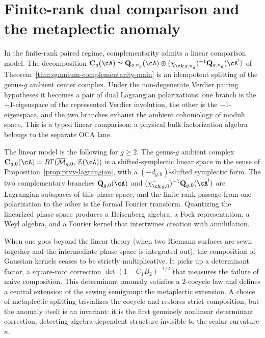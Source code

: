 \section{Finite-rank dual comparison and the metaplectic anomaly}
\label{sec:holographic-complementarity-metaplectic}

In the finite-rank paired regime, complementarity admits a
linear comparison model. The decomposition
$\mathbf{C}_g(\cA)\simeq\mathbf{Q}_{g,n_g}(\cA)\oplus
(\chi^-_{\cA;g,n_g})^{-1}\mathbf{Q}_{g,n_g}(\cA^!)$ of
Theorem~\ref{thm:quantum-complementarity-main}
is an idempotent splitting of the genus-$g$ ambient center complex.
Under the non-degenerate Verdier pairing hypotheses it becomes a
pair of dual Lagrangian polarizations: one branch is the
$+1$-eigenspace of the represented Verdier involution, the other is
the $-1$-eigenspace, and the two branches exhaust the ambient
cohomology of moduli space. This is a typed linear comparison; a
physical bulk factorization algebra belongs to the separate OCA lane.

The linear model is the following for $g\geq2$. The genus-$g$ ambient complex
$\mathbf{C}_{g,0}(\cA) = R\Gamma(\overline{\mathcal{M}}_{g,0},
\mathcal{Z}(\cA))$ is a shifted-symplectic linear space in the sense of
Proposition~\ref{prop:ptvv-lagrangian}, with a
$(-d_{g,0})$-shifted symplectic form.
The two complementary branches $\mathbf{Q}_{g,0}(\cA)$ and
$(\chi^-_{\cA;g,0})^{-1}\mathbf{Q}_{g,0}(\cA^!)$ are Lagrangian
subspaces of this phase space,
and the finite-rank passage from one polarization to the other is the
formal Fourier transform. Quantizing the linearized phase space
produces a Heisenberg algebra, a Fock representation, a Weyl algebra,
and a Fourier kernel that intertwines creation with annihilation.

When one goes beyond the linear theory (when two Riemann surfaces
are sewn together and the intermediate phase space is integrated
out), the composition of Gaussian kernels ceases to be strictly
multiplicative. It picks up a determinant factor, a square-root
correction $\det(1 - C_1 B_2)^{-1/2}$ that measures the failure of
naive composition. This determinant anomaly satisfies a $2$-cocycle
law and defines a central extension of the sewing semigroup: the
metaplectic extension. A choice of metaplectic splitting
trivializes the cocycle and restores strict composition, but the
anomaly itself is an invariant: it is the first genuinely nonlinear
determinant correction, detecting algebra-dependent structure
invisible to the scalar curvature $\kappa$.

